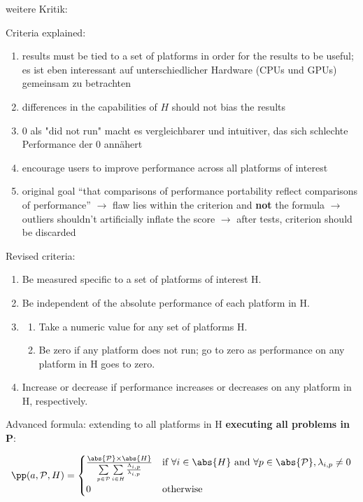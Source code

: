 \cite{pennycook_revisiting_2021}

weitere Kritik: \cite{yokota_beginners_2018, bertoni_performance_2020, siklosi_heterogeneous_2018}

Criteria explained:
\begin{enumerate}
    \item results must be tied to a set of platforms in order for the results to be useful; es ist eben interessant \pp auf unterschiedlicher Hardware (CPUs und GPUs) gemeinsam zu betrachten
    \item differences in the capabilities of $H$ should not bias the results
    \item $0$ als "did not run" macht es vergleichbarer und intuitiver, das sich schlechte Performance der $0$ annähert
    \item encourage users to improve performance across all platforms of interest
    \item original goal \enquote{that comparisons of performance portability reflect comparisons of performance} $\rightarrow$ flaw lies within the criterion and \textbf{not} the formula $\rightarrow$ outliers shouldn't artificially inflate the \pp score $\rightarrow$ after tests, criterion should be discarded
\end{enumerate}

Revised criteria:
\begin{enumerate}
    \item Be measured specific to a set of platforms of interest H.
    \item Be independent of the absolute performance of each platform in H.
    \item 
    \begin{enumerate}
        \item Take a numeric value for any set of platforms H.
        \item Be zero if any platform does not run; go to zero as performance on any platform in H goes to zero.
    \end{enumerate}
    \item Increase or decrease if performance increases or decreases on any platform in H, respectively.
\end{enumerate}

Advanced formula: extending \pp to all platforms in H \textbf{executing all problems in P}:

\[ \pp(a, \mathcal{P}, H) = 
        \begin{cases}
            \frac{\abs{\mathcal{P}}\times\abs{H}}{\sum\limits_{p \in \mathcal{P}}\sum\limits_{i \in H} \frac{\Lambda_{i, p}}{\lambda_{i, p}}} & \text{if }\forall i \in \abs{H}\text{ and }\forall p \in \abs{\mathcal{P}}, \lambda_{i, p} \neq 0 \\
            0                         & \text{otherwise}
        \end{cases} 
    \]

